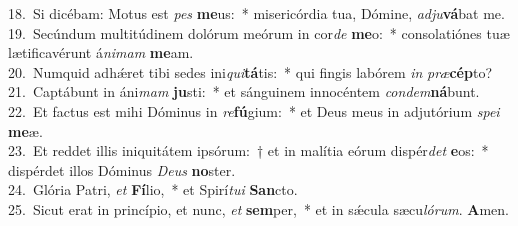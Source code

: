 {18.~}Si dicébam: Motus est \textit{pes} \textbf{me}us:~* misericórdia tua, Dómine, \textit{ad}\textit{ju}\textbf{vá}bat me.\\
{19.~}Secúndum multitúdinem dolórum meórum in cor\textit{de} \textbf{me}o:~* consolatiónes tuæ lætificavérunt á\textit{ni}\textit{mam} \textbf{me}am.\\
{20.~}Numquid adhǽret tibi sedes ini\textit{qui}\textbf{tá}tis:~* qui fingis labórem \textit{in} \textit{præ}\textbf{cép}to?\\
{21.~}Captábunt in áni\textit{mam} \textbf{ju}sti:~* et sánguinem innocéntem \textit{con}\textit{dem}\textbf{ná}bunt.\\
{22.~}Et factus est mihi Dóminus in \textit{re}\textbf{fú}gium:~* et Deus meus in adjutórium \textit{spe}\textit{i} \textbf{me}æ.\\
{23.~}Et reddet illis iniquitátem ipsórum:~† et in malítia eórum dispér\textit{det} \textbf{e}os:~* dispérdet illos Dóminus \textit{De}\textit{us} \textbf{no}ster.\\
{24.~}Glória Patri, \textit{et} \textbf{Fí}lio,~* et Spirí\textit{tu}\textit{i} \textbf{San}cto.\\
{25.~}Sicut erat in princípio, et nunc, \textit{et} \textbf{sem}per,~* et in sǽcula sæcu\textit{ló}\textit{rum}. \textbf{A}men.\\

